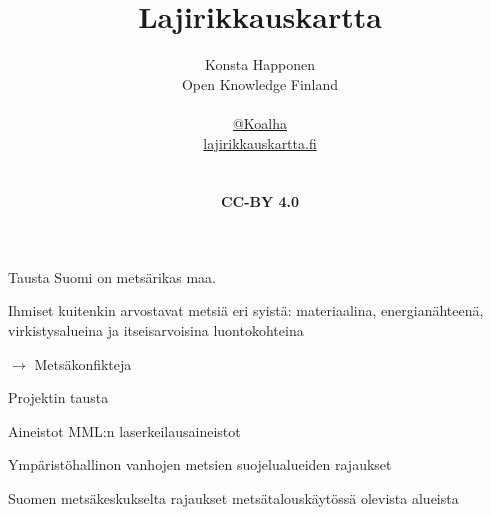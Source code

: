 \documentclass{beamer}
\title{Lajirikkauskartta}
\author{\parbox{\textwidth}{Konsta Happonen\\
    Open Knowledge Finland\\
    \\
    \href{http://twitter.com/koalha}{@Koalha}\\
    \url{lajirikkauskartta.fi}}\\
    \\
    \textbf{CC-BY 4.0}
}
\date{}
\begin{document}
\maketitle

\begin{frame}{Tausta}
  Suomi on metsärikas maa.

  Ihmiset kuitenkin arvostavat metsiä eri syistä: materiaalina, energianähteenä, virkistysalueina ja itseisarvoisina luontokohteina

  \vspace{1cm}
  
  \Huge $\rightarrow$ Metsäkonfikteja

\end{frame}


\begin{frame}{Projektin tausta}
\begin{figure}
\end{figure}

\begin{figure}
\end{figure}

\end{frame}


\begin{frame}{Aineistot}
  MML:n laserkeilausaineistot

  Ympäristöhallinon vanhojen metsien suojelualueiden rajaukset

  Suomen metsäkeskukselta rajaukset metsätalouskäytössä olevista alueista
  
\end{frame}
\end{document}
